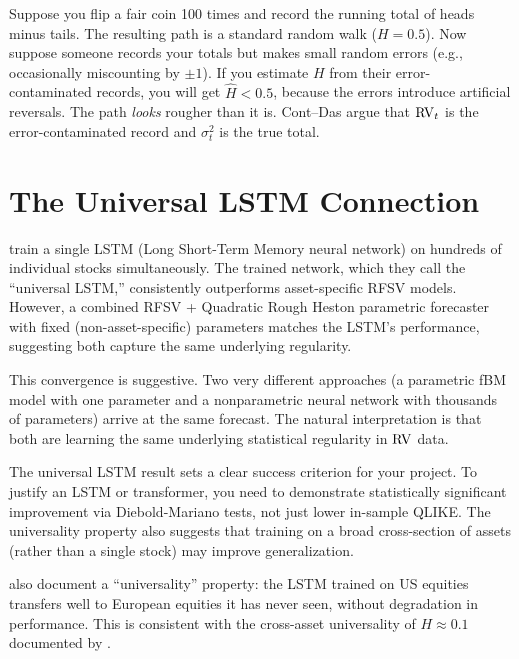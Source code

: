 \begin{intuition}
Suppose you flip a fair coin 100 times and record the running total of heads minus tails.
The resulting path is a standard random walk ($H = 0.5$).
Now suppose someone records your totals but makes small random errors (e.g., occasionally miscounting by $\pm 1$).
If you estimate $H$ from their error-contaminated records, you will get $\hat{H} < 0.5$, because the errors introduce artificial reversals.
The path \emph{looks} rougher than it is.
Cont--Das argue that $\operatorname{RV}_t$ is the error-contaminated record and $\sigma^2_t$ is the true total.
\end{intuition}


\section{The Universal LSTM Connection}
\label{sec:universal-lstm}

\citet{RosenbaumZhang2022} train a single LSTM (Long Short-Term Memory neural network) on hundreds of individual stocks simultaneously.
The trained network, which they call the ``universal LSTM,'' consistently outperforms asset-specific RFSV models.
However, a combined RFSV + Quadratic Rough Heston parametric forecaster with fixed (non-asset-specific) parameters matches the LSTM's performance, suggesting both capture the same underlying regularity.

This convergence is suggestive.
Two very different approaches (a parametric fBM model with one parameter and a nonparametric neural network with thousands of parameters) arrive at the same forecast.
The natural interpretation is that both are learning the same underlying statistical regularity in $\operatorname{RV}$ data.

\begin{projectconnection}
The universal LSTM result sets a clear success criterion for your project.
To justify an LSTM or transformer, you need to demonstrate statistically significant improvement via Diebold-Mariano tests, not just lower in-sample QLIKE.
The universality property also suggests that training on a broad cross-section of assets (rather than a single stock) may improve generalization.
\end{projectconnection}

\citet{RosenbaumZhang2022} also document a ``universality'' property: the LSTM trained on US equities transfers well to European equities it has never seen, without degradation in performance.
This is consistent with the cross-asset universality of $H \approx 0.1$ documented by \citet{BLP2022}.

